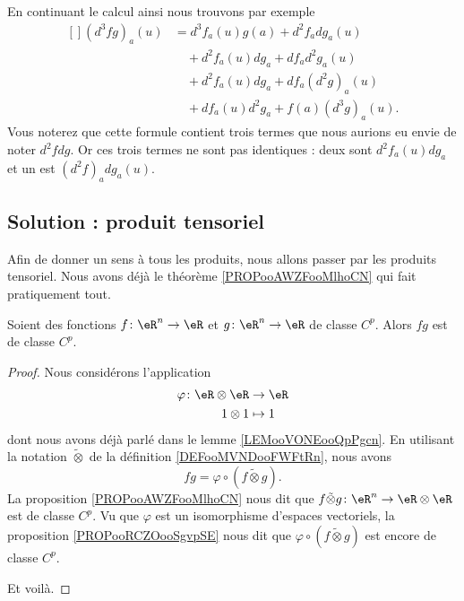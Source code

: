 En continuant le calcul ainsi nous trouvons par exemple
\begin{equation}
	\begin{aligned}[]
		(d^3fg)_a(u) & =d^3f_a(u)g(a)+d^2f_adg_a(u)          \\
		             & \quad +d^2f_a(u)dg_a+df_ad^2g_a(u)    \\
		             & \quad +d^2f_a(u)dg_a+df_a(d^2g)_a(u)  \\
		             & \quad +df_a(u)d^2g_a+f(a)(d^3g)_a(u).
	\end{aligned}
\end{equation}
Vous noterez que cette formule contient trois termes que nous aurions eu envie de noter \( d^2fdg\). Or ces trois termes ne sont pas identiques : deux sont \( d^2f_a(u)dg_a\) et un est \( (d^2f)_adg_a(u)\).

\subsection{Solution : produit tensoriel}

Afin de donner un sens à tous les produits, nous allons passer par les produits tensoriel. Nous avons déjà le théorème \ref{PROPooAWZFooMlhoCN} qui fait pratiquement tout.

\begin{proposition}      \label{PROPooWNCGooHbmcVb}
	Soient des fonctions \( f\colon \eR^n\to \eR\) et \( g\colon \eR^n\to \eR\) de classe \( C^p\). Alors \( fg\) est de classe \( C^p\).
\end{proposition}

\begin{proof}
	Nous considérons l'application
	\begin{equation}
		\begin{aligned}
			\varphi\colon \eR\otimes \eR & \to \eR   \\
			1\otimes 1                   & \mapsto 1
		\end{aligned}
	\end{equation}
	dont nous avons déjà parlé dans le lemme \ref{LEMooVONEooQpPgcn}. En utilisant la notation \( \tilde\otimes\) de la définition \ref{DEFooMVNDooFWFtRn}, nous avons
	\begin{equation}
		fg=\varphi\circ(f\tilde\otimes g).
	\end{equation}
	La proposition \ref{PROPooAWZFooMlhoCN} nous dit que \( f\tilde\otimes g\colon \eR^n\to \eR\otimes \eR\) est de classe \( C^p\). Vu que \( \varphi\) est un isomorphisme d'espaces vectoriels, la proposition \ref{PROPooRCZOooSgvpSE} nous dit que \( \varphi\circ(f\tilde\otimes g)\) est encore de classe \( C^p\).

	Et voilà.
\end{proof}

